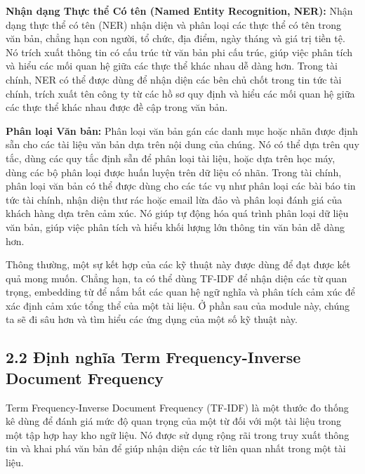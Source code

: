 \textbf{Nhận dạng Thực thể Có tên (Named Entity Recognition, NER):} Nhận dạng thực thể có tên (NER) nhận diện và phân loại các thực thể có tên trong văn bản, chẳng hạn con người, tổ chức, địa điểm, ngày tháng và giá trị tiền tệ. Nó trích xuất thông tin có cấu trúc từ văn bản phi cấu trúc, giúp việc phân tích và hiểu các mối quan hệ giữa các thực thể khác nhau dễ dàng hơn. Trong tài chính, NER có thể được dùng để nhận diện các bên chủ chốt trong tin tức tài chính, trích xuất tên công ty từ các hồ sơ quy định và hiểu các mối quan hệ giữa các thực thể khác nhau được đề cập trong văn bản.

\textbf{Phân loại Văn bản:} Phân loại văn bản gán các danh mục hoặc nhãn được định sẵn cho các tài liệu văn bản dựa trên nội dung của chúng. Nó có thể dựa trên quy tắc, dùng các quy tắc định sẵn để phân loại tài liệu, hoặc dựa trên học máy, dùng các bộ phân loại được huấn luyện trên dữ liệu có nhãn. Trong tài chính, phân loại văn bản có thể được dùng cho các tác vụ như phân loại các bài báo tin tức tài chính, nhận diện thư rác hoặc email lừa đảo và phân loại đánh giá của khách hàng dựa trên cảm xúc. Nó giúp tự động hóa quá trình phân loại dữ liệu văn bản, giúp việc phân tích và hiểu khối lượng lớn thông tin văn bản dễ dàng hơn.

Thông thường, một sự kết hợp của các kỹ thuật này được dùng để đạt được kết quả mong muốn. Chẳng hạn, ta có thể dùng TF-IDF để nhận diện các từ quan trọng, embedding từ để nắm bắt các quan hệ ngữ nghĩa và phân tích cảm xúc để xác định cảm xúc tổng thể của một tài liệu. Ở phần sau của module này, chúng ta sẽ đi sâu hơn và tìm hiểu các ứng dụng của một số kỹ thuật này.

\subsection{2.2 Định nghĩa Term Frequency-Inverse Document Frequency}

Term Frequency-Inverse Document Frequency (TF-IDF) là một thước đo thống kê dùng để đánh giá mức độ quan trọng của một từ đối với một tài liệu trong một tập hợp hay kho ngữ liệu. Nó được sử dụng rộng rãi trong truy xuất thông tin và khai phá văn bản để giúp nhận diện các từ liên quan nhất trong một tài liệu.

